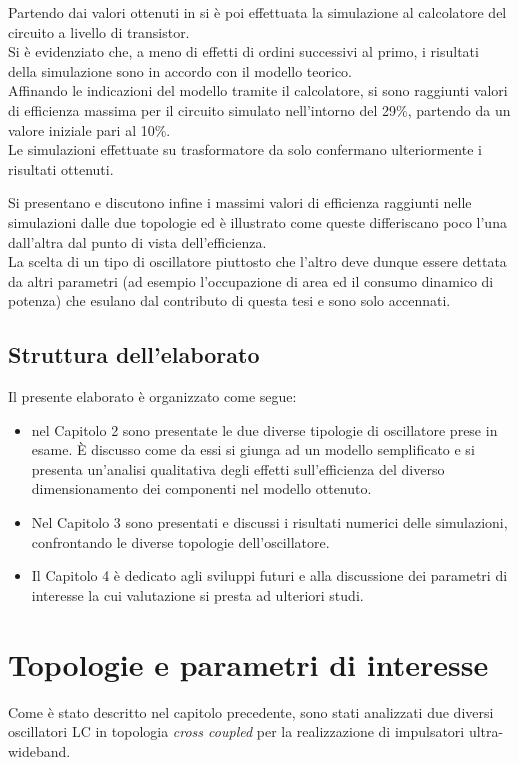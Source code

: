 \documentclass[a4paper, 12pt]{memoir}
\begin{document}
Partendo dai valori ottenuti in\cite{Neviani14} si è poi effettuata la
simulazione al calcolatore del circuito a livello di transistor.\\
Si è evidenziato che, a meno di effetti di ordini successivi al primo, i
risultati della simulazione sono in accordo con il modello teorico.\\
Affinando le indicazioni del modello tramite il calcolatore, si sono
raggiunti valori di efficienza massima per il circuito simulato nell'intorno
del 29\%, partendo da un valore iniziale pari al 10\%.\\
Le simulazioni effettuate su trasformatore da solo confermano ulteriormente i
risultati ottenuti.

Si presentano e discutono infine i massimi valori di efficienza raggiunti nelle
simulazioni dalle due topologie ed è illustrato come queste differiscano poco 
l'una dall'altra dal punto di vista dell'efficienza. \\
La scelta di un tipo di oscillatore piuttosto che l'altro deve dunque essere
dettata da altri parametri (ad esempio l'occupazione di area ed il consumo
dinamico di potenza) che esulano dal contributo di questa tesi e sono solo
accennati.
\newpage
\section{Struttura dell'elaborato}
Il presente elaborato è organizzato come segue:
\begin{itemize}
\item nel Capitolo 2 sono presentate le due diverse tipologie di oscillatore
	prese in esame. \`E discusso come da essi si giunga ad un modello
	semplificato e si presenta un'analisi qualitativa degli effetti
	sull'efficienza del diverso dimensionamento dei componenti nel
	modello ottenuto.
\item Nel Capitolo 3 sono presentati e discussi i risultati numerici delle
	simulazioni, confrontando le diverse topologie dell'oscillatore.
\item Il Capitolo 4 è dedicato agli sviluppi futuri e alla discussione dei
	parametri di interesse la cui valutazione si presta ad ulteriori studi.
\end{itemize}
\chapter{Topologie e parametri di interesse}
Come è stato descritto nel capitolo precedente, sono stati analizzati due
diversi oscillatori LC in topologia \emph{cross coupled} per la realizzazione di
impulsatori ultra-wideband.
\end{document}
